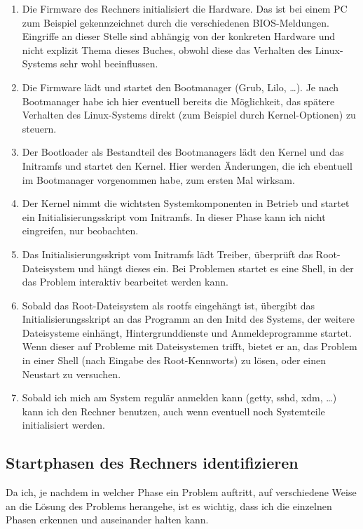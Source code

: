 \begin{enumerate}
  \item Die Firmware des Rechners initialisiert die Hardware. Das ist bei
    einem PC zum Beispiel gekennzeichnet durch die verschiedenen
    BIOS-Meldungen. Eingriffe an dieser Stelle sind abhängig von der konkreten
    Hardware und nicht explizit Thema dieses Buches, obwohl diese das
    Verhalten des Linux-Systems sehr wohl beeinflussen.
  \item Die Firmware lädt und startet den Bootmanager (Grub, Lilo, \ldots). Je
    nach Bootmanager habe ich hier eventuell bereits die Möglichkeit, das
    spätere Verhalten des Linux-Systems direkt (zum Beispiel durch
    Kernel-Optionen) zu steuern.
  \item Der Bootloader als Bestandteil des Bootmanagers lädt den Kernel und
    das Initramfs und startet den Kernel. Hier werden Änderungen, die ich
    ebentuell im Bootmanager vorgenommen habe, zum ersten Mal wirksam.
  \item Der Kernel nimmt die wichtsten Systemkomponenten in Betrieb und
    startet ein Initialisierungsskript vom Initramfs. In dieser Phase kann ich
    nicht eingreifen, nur beobachten.
  \item Das Initialisierungsskript vom Initramfs lädt Treiber, überprüft das
    Root-Dateisystem und hängt dieses ein. Bei Problemen startet es eine
    Shell, in der das Problem interaktiv bearbeitet werden kann.
  \item Sobald das Root-Dateisystem als rootfs eingehängt ist, übergibt das
    Initialisierungsskript an das Programm an den Initd des Systems, der
    weitere Dateisysteme einhängt, Hintergrunddienste und Anmeldeprogramme
    startet. Wenn dieser auf Probleme mit Dateisystemen trifft, bietet er an,
    das Problem in einer Shell (nach Eingabe des Root-Kennworts) zu lösen,
    oder einen Neustart zu versuchen.
  \item Sobald ich mich am System regulär anmelden kann (getty, sshd, xdm,
    \ldots) kann ich den Rechner benutzen, auch wenn eventuell noch
    Systemteile initialisiert werden.
\end{enumerate}

\subsection{Startphasen des Rechners identifizieren}

Da ich, je nachdem in welcher Phase ein Problem auftritt, auf verschiedene
Weise an die Lösung des Problems herangehe, ist es wichtig, dass ich die
einzelnen Phasen erkennen und auseinander halten kann.

